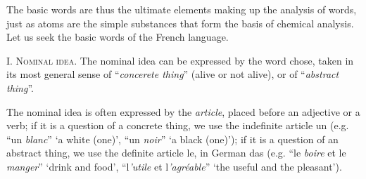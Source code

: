 {      The basic words are thus the ultimate elements making up the
      analysis of words, just as atoms are the simple substances that
      form the basis of chemical analysis. Let us seek the basic words
      of the French language.

      I. \textsc{Nominal idea}. The nominal idea can be expressed by
      the word \textup{chose}, taken in its most general sense of
      ``\emph{concerete thing}'' (alive or not alive), or of
      ``\emph{abstract thing}''.

      The nominal idea is often expressed by the \emph{article},
      placed before an adjective or a verb; if it is a question of a
      concrete thing, we use the indefinite article \textup{un}
      (e.g. ``\textup{un} \emph{blanc}'' `a white (one)',
      ``\textup{un} \emph{noir}'' `a black (one)'); if it is a
      question of an abstract thing, we use the definite article
      \textup{le}, in German \textup{das} (e.g. ``\textup{le}
      \emph{boire} et \textup{le} \emph{manger}'' `drink and food',
      ``\textup{l}\emph{'utile} et \textup{l}\emph{'agréable}'' `the
      useful and the pleasant').}

